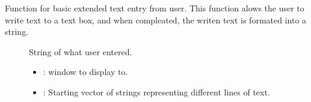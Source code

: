\documentclass[letterpaper,10pt,english]{sphinxmanual}
\begin{document}
\begin{fulllineitems}

\begin{fulllineitems}
\label{\detokenize{index:_CPPv2N7ostendo7TextBoxEN7ostendo6WindowENSt6vectorINSt6stringEEE}}%
\pysigstartmultiline
{}\label{\detokenize{index:Pessumnamespaceostendo_1a2f50af8d4996899c0906b9c78e045e84}}%
\pysigstopmultiline
Function for basic extended text entry from user. This function alows the user to write text to a text box, and when compleated, the writen text is formated into a string. \begin{description}
\item[{}] \leavevmode
String of what user entered. 

\item[{}] \leavevmode
{\hyperref[\detokenize{index:Pessumclassostendo_1_1Window}]{}} 

\item[{}] \leavevmode\begin{itemize}
\item {} 
: window to display to. 

\item {} 
: Starting vector of strings representing different lines of text. 

\end{itemize}

\end{description}


\end{fulllineitems}



\end{fulllineitems}
\end{document}
